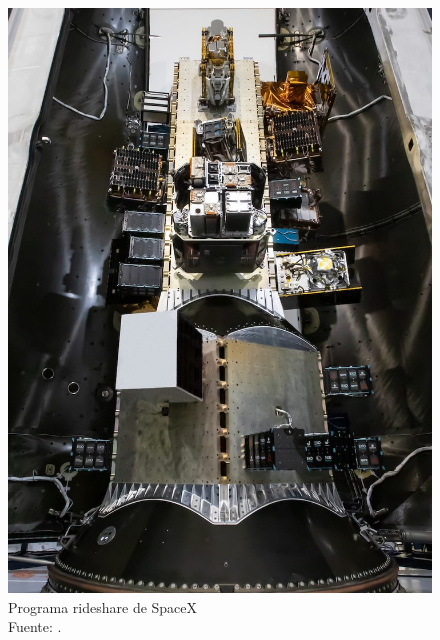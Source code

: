 \begin{figure}[H]
    \centering
    \begin{minipage}[t]{0.48\textwidth}
        \centering
        \includegraphics[width=0.8\linewidth]{6.Lanzadores/Transporter-9_small-735101042.jpg}
        \caption{Programa rideshare de SpaceX\\ Fuente: \cite{SFNow_Transporter9_2023}.}
        \label{fig:imagen1}
    \end{minipage}
    \hfill
    \begin{minipage}[t]{0.5\textwidth}
        \centering

\end{minipage}
\end{figure}
